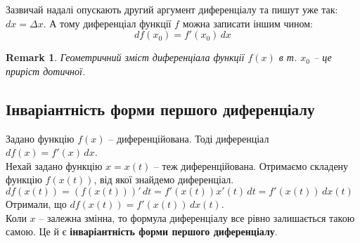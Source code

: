 \documentclass[a4paper, 14pt]{article}
\theoremstyle{theoremdd}
\theoremstyle{theoremdd}
\theoremstyle{theoremdd}
\theoremstyle{theoremdd}
\theoremstyle{theoremdd}
\theoremstyle{theoremdd}
\newtheorem{remark}[theorem]{Remark}
\theoremstyle{theoremdd}
\theoremstyle{theoremdd}
\begin{document}
Зазвичай надалі опускають другий аргумент диференціалу та пишут уже так: $dx = \Delta x$. А тому диференціал функції $f$ можна записати іншим чином:
$$ df(x_0) = f'(x_0)\,dx $$

\begin{remark}
Геометричний зміст диференціала функції $f(x)$ в т. $x_0$ -- це приріст дотичної.
\\ \iffalse %
\begin{figure}[H]
\centering
\begin{tikzpicture}[spy using outlines={circle,yellow,magnification=5,size=6cm, connect spies}]
\draw[thick, ->] (-3,0)--(2.5,0) node[below = 2pt] {$x$};
\draw[thick, ->] (0,-0.5)--(0,4) node[left = 2pt] {$y$};
\draw[thick, domain=-2.5:2, variable=\x] plot({\x}, {exp(\x*ln(2))}) node[anchor = west, scale = 0.7] {$f(x)$};
\draw[thick, domain=-0.5:1.5, red, variable=\x] plot({\x}, {sqrt(2)*ln(2)*(\x-0.5)+sqrt(2)});
\draw[dashed] (0.5, {sqrt(2)})--(0.5,0) node [anchor = north, scale = 0.7] {$x_0$};
\draw[dashed] (1, {exp(1*ln(2))})--(1,0) node [anchor = north west, scale = 0.7] {$x_0+\Delta x$};
\draw[blue] (1, {2*ln(2)*(-0.1)+2})--(1, {sqrt(2)});
\draw[green] (1, {exp(1*ln(2))})--(1, {2*ln(2)*(-0.1)+2});
\draw[dashed] (1, {sqrt(2)})--(0.5, {sqrt(2)});
\draw (0.5+0.2, {sqrt(2)}) arc (0:{atan(2*ln(2))}:0.2) node [anchor = west,scale = 0.3] {$\alpha$};
\node at (0.8, {sqrt(2)}) [scale = 0.3,anchor = north] {$dx$};
\node at (1.15, {2*ln(2)*(-0.1)+2}) [scale = 0.2, anchor = north, blue] {$df(x_0)$};
\spy on (0.7, {exp(0.7*ln(2))}) in node[left] at (12,2);
\end{tikzpicture}
\caption*{Синій - це $df(x_0)$: приблизна різниця між функціями в двох точках. А синій + зелений - це $\Delta f(x_0)$: точна різниця між функціями в двох точках.}
\end{figure}
\fi %
\end{remark}

\subsection{Інваріантність форми першого диференціалу}
Задано функцію $f(x)$ -- диференційована. Тоді диференціал $df(x) = f'(x)\,dx$.\\
Нехай задано функцію $x = x(t)$ -- теж диференційована. Отримаємо складену функцію $f(x(t))$, від якої знайдемо диференціал.\\
$df(x(t)) = (f(x(t)))'\,dt = f'(x(t))x'(t)\,dt = f'(x(t))\,dx(t)$\\
Отримали, що $df(x(t)) = f'(x(t))\,dx(t)$.\\
Коли $x$ -- залежна змінна, то формула диференціалу все рівно залишається такою самою. Це й є \textbf{інваріантність форми першого диференціалу}.
\end{document}
